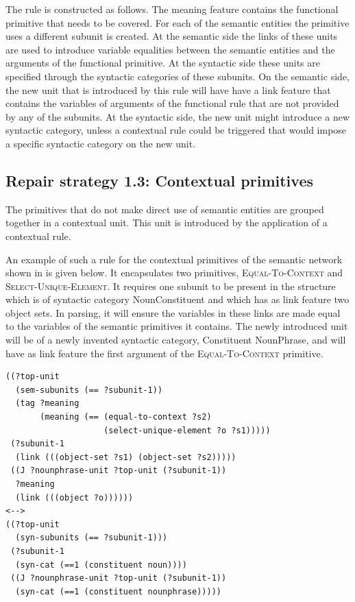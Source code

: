The rule is constructed as follows. The meaning feature contains the
functional primitive that needs to be covered. For each of the
semantic entities the primitive uses a different subunit is
created. At the semantic side the links of these units are used to
introduce variable equalities between the semantic entities and the
arguments of the functional primitive. At the syntactic side these
units are specified through the syntactic categories of these
subunits.  On the semantic side, the new unit that is introduced by
this rule will have have a link feature that contains the variables of
arguments of the functional rule that are not provided by any of the
subunits. At the syntactic side, the new unit might introduce a new
syntactic category, unless a contextual rule could be triggered that
would impose a specific syntactic category on the new unit.

\subsection{Repair strategy 1.3: Contextual primitives}

The primitives that do not make direct use of semantic entities are
grouped together in a contextual unit. This unit is introduced
by the application of a contextual rule. 

An example of such a rule for the contextual primitives of the
semantic network shown in  is given
below. It encapsulates two primitives, \textsc{Equal-To-Context} and
\textsc{Select-Unique-Element}. It requires one subunit to be present
in the structure which is of syntactic category NounConstituent and
which has as link feature two object sets. In parsing, it will ensure
the variables in these links are made equal to the variables of the
semantic primitives it contains. The newly introduced unit will be of
a newly invented syntactic category, Constituent NounPhrase, and will
have as link feature the first argument of the
\textsc{Equal-To-Context} primitive.

\footnotesize
{}
\begin{lstlisting}
((?top-unit
  (sem-subunits (== ?subunit-1))
  (tag ?meaning
       (meaning (== (equal-to-context ?s2) 
                    (select-unique-element ?o ?s1)))))
 (?subunit-1 
  (link (((object-set ?s1) (object-set ?s2)))))
 ((J ?nounphrase-unit ?top-unit (?subunit-1))
  ?meaning
  (link (((object ?o))))))
<-->
((?top-unit 
  (syn-subunits (== ?subunit-1)))
 (?subunit-1 
  (syn-cat (==1 (constituent noun))))
 ((J ?nounphrase-unit ?top-unit (?subunit-1))
  (syn-cat (==1 (constituent nounphrase)))))
\end{lstlisting}
\normalsize

